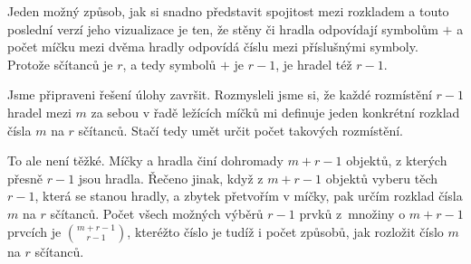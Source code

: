 Jeden možný způsob, jak si snadno představit spojitost mezi rozkladem a touto
poslední verzí jeho vizualizace je ten, že stěny či hradla odpovídají symbolům
$+$ a počet míčku mezi dvěma hradly odpovídá číslu mezi příslušnými symboly.
Protože sčítanců je $r$, a tedy symbolů $+$ je $r - 1$, je hradel též $r - 1$.

Jsme připraveni řešení úlohy završit. Rozmysleli jsme si, že každé rozmístění $r
- 1$ hradel mezi $m$ za sebou v řadě ležících míčků mi definuje jeden konkrétní
rozklad čísla $m$ na $r$ sčítanců. Stačí tedy umět určit počet takových
rozmístění.

To ale není těžké. Míčky a hradla činí dohromady $m + r - 1$ objektů, z kterých
přesně $r - 1$ jsou hradla. Řečeno jinak, když z $m + r - 1$ objektů vyberu těch
$r - 1$, která se stanou hradly, a zbytek přetvořím v míčky, pak určím rozklad
čísla $m$ na $r$ sčítanců. Počet všech možných výběrů $r - 1$ prvků z~množiny o
$m + r - 1$ prvcích je $\binom{m + r - 1}{r-1}$, kteréžto číslo je tudíž i počet
způsobů, jak rozložit číslo $m$ na $r$ sčítanců.
